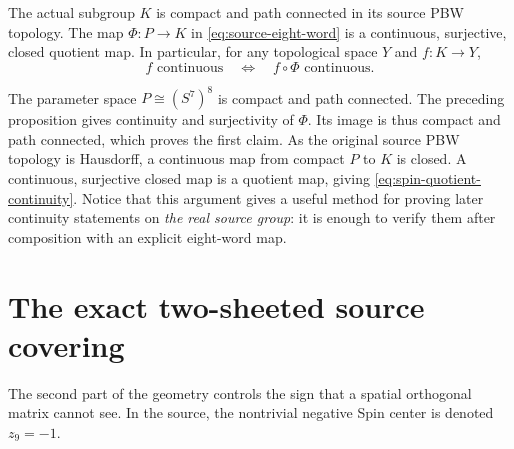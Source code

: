 \begin{sourceaccount}
\label{thm:source-K-compact-connected}
The actual subgroup $K$ is compact and path connected in its source PBW
topology. The map $\Phi:P\to K$ in \eqref{eq:source-eight-word} is a
continuous, surjective, closed quotient map. In particular, for any
topological space $Y$ and $f:K\to Y$,
\begin{equation}\label{eq:spin-quotient-continuity}
 f\text{ continuous}\quad\Longleftrightarrow\quad
 f\circ\Phi\text{ continuous}.
\end{equation}
\end{sourceaccount}
\begin{sourceexplanation}
The parameter space $P\cong(S^7)^8$ is compact and path connected.
The preceding proposition gives continuity and surjectivity of $\Phi$.
Its image is thus compact and path connected, which proves the first
claim. As the original source PBW topology is Hausdorff, a continuous
map from compact $P$ to $K$ is closed. A continuous, surjective closed
map is a quotient map, giving \eqref{eq:spin-quotient-continuity}.
Notice that this argument gives a useful method for proving later
continuity statements on \emph{the real source group}: it is enough
to verify them after composition with an explicit eight-word map.
\end{sourceexplanation}

\section{The exact two-sheeted source covering}
The second part of the geometry controls the sign that a spatial
orthogonal matrix cannot see. In the source, the nontrivial negative
Spin center is denoted $z_9=-1$.


